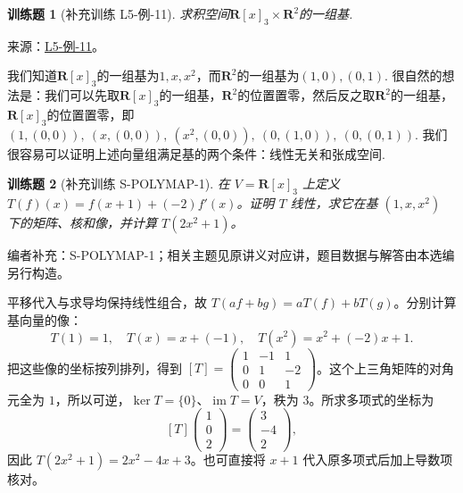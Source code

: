 \documentclass[UTF8,12pt,a4paper,fontset=fandol]{ctexart}
\newtheorem{exercise}{训练题}[section]
\begin{document}
\begin{exercise}[补充训练 L5-例-11]\label{prob:L5-例-11}
求积空间$\mathbf{R}[x]_3\times\mathbf{R}^2$的一组基.
\end{exercise}
\noindent 来源：\href{https://github.com/yhwu-is/Linear-Algebra-Left-Undone/blob/new/%E8%AE%B2%E4%B9%89/%E4%B8%93%E9%A2%98/5%20%E7%BA%BF%E6%80%A7%E6%98%A0%E5%B0%84.tex}{L5-例-11}。
\begin{solve}
我们知道$\mathbf{R}[x]_3$的一组基为$1,x,x^2$，而$\mathbf{R}^2$的一组基为$(1,0),(0,1)$. 很自然的想法是：我们可以先取$\mathbf{R}[x]_3$的一组基，$\mathbf{R}^2$的位置置零，然后反之取$\mathbf{R}^2$的一组基，$\mathbf{R}[x]_3$的位置置零，即$(1,(0,0)),\ (x,(0,0)),\ (x^2,(0,0)),\ (0,(1,0)),\ (0,(0,1))$. 我们很容易可以证明上述向量组满足基的两个条件：线性无关和张成空间.
\end{solve}

\begin{exercise}[补充训练 S-POLYMAP-1]\label{prob:S-POLYMAP-1}
在 $V=\mathbf R[x]_3$ 上定义 $T(f)(x)=f(x+1)+(-2)f'(x)$。证明 $T$ 线性，求它在基 $(1,x,x^2)$ 下的矩阵、核和像，并计算 $T(2x^{2}+1)$。
\end{exercise}
\noindent 编者补充：S-POLYMAP-1；相关主题见原讲义对应讲，题目数据与解答由本选编另行构造。
\begin{solve}
平移代入与求导均保持线性组合，故 $T(af+bg)=aT(f)+bT(g)$。分别计算基向量的像：
\[T(1)=1,\quad T(x)=x+(-1),\quad T(x^2)=x^2+(-2)x+1.\]
把这些像的坐标按列排列，得到 $[T]=\begin{pmatrix}1&-1&1\\0&1&-2\\0&0&1\end{pmatrix}$。这个上三角矩阵的对角元全为 $1$，所以可逆，$\ker T=\{0\}$、$\operatorname{im} T=V$，秩为 $3$。所求多项式的坐标为
\[[T]\begin{pmatrix}1\\0\\2\end{pmatrix}=\begin{pmatrix}3\\-4\\2\end{pmatrix},\]
因此 $T(2x^{2}+1)=2x^{2}-4x+3$。也可直接将 $x+1$ 代入原多项式后加上导数项核对。
\end{solve}
\end{document}
